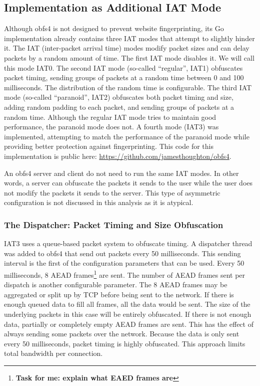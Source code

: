 \documentclass[11pt]{article}
\begin{document}
\subsection{Implementation as Additional IAT Mode}
Although obfs4 is not designed to prevent website fingerprinting, its Go implementation already contains three IAT modes that attempt to slightly hinder it. The IAT (inter-packet arrival time) modes modify packet sizes and can delay packets by a random amount of time. The first IAT mode disables it. We will call this mode IAT0. The second IAT mode (so-called ``regular'', IAT1) obfuscates packet timing, sending groups of packets at a random time between 0 and 100 milliseconds. The distribution of the random time is configurable. The third IAT mode (so-called ``paranoid'', IAT2) obfuscates both packet timing and size, adding random padding to each packet, and sending groups of packets at a random time. Although the regular IAT mode tries to maintain good performance, the paranoid mode does not. A fourth mode (IAT3) was implemented, attempting to match the performance of the paranoid mode while providing better protection against fingerprinting. This code for this implementation is public here: \href{https://github.com/jamesthoughton/obfs4}{https://github.com/jamesthoughton/obfs4}.

An obfs4 server and client do not need to run the same IAT modes. In other words, a server can obfuscate the packets it sends to the user while the user does not modify the packets it sends to the server. This type of asymmetric configuration is not discussed in this analysis as it is atypical.

\subsubsection{The Dispatcher: Packet Timing and Size Obfuscation}
IAT3 uses a queue-based packet system to obfuscate timing. A dispatcher thread was added to obfs4 that send out packets every 50 milliseconds. This sending interval is the first of the configuration parameters that can be used. Every 50 milliseconds, 8 AEAD frames\footnote{\textbf{Task for me: explain what EAED frames are}} are sent. The number of AEAD frames sent per dispatch is another configurable parameter. The 8 AEAD frames may be aggregated or split up by TCP before being sent to the network. If there is enough queued data to fill all frames, all the data would be sent. The size of the underlying packets in this case will be entirely obfuscated. If there is not enough data, partially or completely empty AEAD frames are sent. This has the effect of always sending some packets over the network. Because the data is only sent every 50 milliseconds, packet timing is highly obfuscated. This approach limits total bandwidth per connection.
\end{document}
